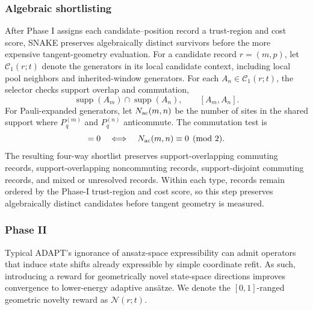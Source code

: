 \documentclass[
  reprint,
  amsmath,
  amssymb,
  aps,
  pra,
  nofootinbib,
  superscriptaddress,
  floatfix
]{revtex4-2}
\begin{document}
\subsubsection{Algebraic shortlisting}
After Phase I assigns each candidate--position record a trust-region and cost score, SNAKE preserves algebraically distinct survivors before the more expensive tangent-geometry evaluation.  For a candidate record $r=(m,p)$, let $\mathcal C_1(r;t)$ denote the generators in its local candidate context, including local pool neighbors and inherited-window generators.  For each $A_n\in\mathcal C_1(r;t)$, the selector checks support overlap and commutation,
\begin{equation}
\operatorname{supp}(A_m)\cap\operatorname{supp}(A_n),
\qquad
[A_m,A_n].
\label{eq:algebraic_shortlist_checks}
\end{equation}
For Pauli-expanded generators, let $N_{\rm ac}(m,n)$ be the number of sites in the shared support where $P_q^{(m)}$ and $P_q^{(n)}$ anticommute.  The commutation test is
\begin{equation}
[A_m,A_n]=0
\quad\Longleftrightarrow\quad
N_{\rm ac}(m,n)\equiv 0 \pmod 2.
\label{eq:pauli_commutation_parity}
\end{equation}
The resulting four-way shortlist preserves support-overlapping commuting records, support-overlapping noncommuting records, support-disjoint commuting records, and mixed or unresolved records.  Within each type, records remain ordered by the Phase-I trust-region and cost score, so this step preserves algebraically distinct candidates before tangent geometry is measured.

\subsubsection{Phase II}
Typical ADAPT's ignorance of ansatz-space expressibility can admit operators that induce state shifts already expressible by simple coordinate refit. As such, introducing a reward for geometrically novel state-space directions improves convergence to lower-energy adaptive ansätze. We denote the $[0,1]$-ranged geometric novelty reward as $\mathcal N(r;t)$.
\end{document}
